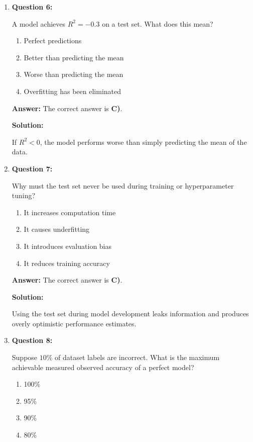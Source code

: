 \documentclass{article}
\begin{document}
\begin{enumerate}
\item \textbf{Question 6:}

A model achieves $R^2 = -0.3$ on a test set. What does this mean?

\begin{enumerate}
    \item Perfect predictions
    \item Better than predicting the mean
    \item Worse than predicting the mean
    \item Overfitting has been eliminated
\end{enumerate}

\textbf{Answer:} The correct answer is \textbf{C)}.

\textbf{Solution:}

If $R^2 < 0$, the model performs worse than simply predicting the mean of the data.

\vspace{6pt}

\item \textbf{Question 7:}

Why must the test set never be used during training or hyperparameter tuning?

\begin{enumerate}
    \item It increases computation time
    \item It causes underfitting
    \item It introduces evaluation bias
    \item It reduces training accuracy
\end{enumerate}

\textbf{Answer:} The correct answer is \textbf{C)}.

\textbf{Solution:}

Using the test set during model development leaks information and produces overly optimistic performance estimates.

\vspace{6pt}

\item \textbf{Question 8:}

Suppose $10\%$ of dataset labels are incorrect. What is the maximum achievable measured observed accuracy of a perfect model?

\begin{enumerate}
    \item 100\%
    \item 95\%
    \item 90\%
    \item 80\%
\end{enumerate}


\end{enumerate}
\end{document}
